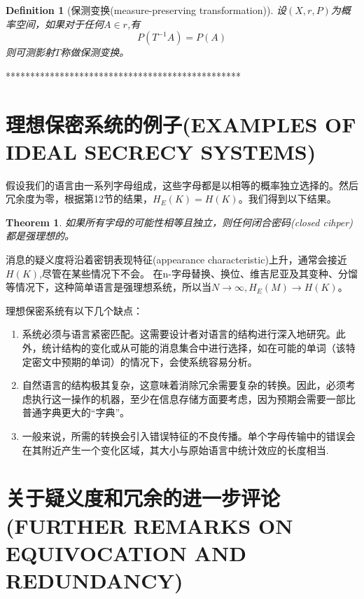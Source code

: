 \documentclass[]{article}
\newtheorem{theorem}{Theorem}
\newtheorem {definition}{Definition}
\begin{document}
\begin{definition}[保测变换(measure-preserving transformation)]
	设$(X,r,P)$为概率空间，如果对于任何$A\in r$,有
	\[P(T^{-1}A)=P(A)\]
	则可测影射$T$称做保测变换。
\end{definition}
************************************************\par
\vspace{1cm}
\newpage
%   
%

\section{理想保密系统的例子(EXAMPLES OF IDEAL SECRECY SYSTEMS)}

假设我们的语言由一系列字母组成，这些字母都是以相等的概率独立选择的。然后冗余度为零，根据第12节的结果，$H_E(K)=H(K)$。我们得到以下结果。

\begin{theorem}
	如果所有字母的可能性相等且独立，则任何闭合密码(closed cihper)都是强理想的。
\end{theorem}

消息的疑义度将沿着密钥表现特征(appearance characteristic)上升，通常会接近$H(K)$,尽管在某些情况下不会。
在n-字母替换、换位、维吉尼亚及其变种、分馏等情况下，这种简单语言是强理想系统，所以当$N\rightarrow \infty,H_E(M)\rightarrow H(K)$。

理想保密系统有以下几个缺点：
\begin{enumerate}
	\item 系统必须与语言紧密匹配。这需要设计者对语言的结构进行深入地研究。此外，统计结构的变化或从可能的消息集合中进行选择，如在可能的单词（该特定密文中预期的单词）的情况下，会使系统容易分析。
	\item 自然语言的结构极其复杂，这意味着消除冗余需要复杂的转换。因此，必须考虑执行这一操作的机器，至少在信息存储方面要考虑，因为预期会需要一部比普通字典更大的“字典”。
	\item 一般来说，所需的转换会引入错误特征的不良传播。单个字母传输中的错误会在其附近产生一个变化区域，其大小与原始语言中统计效应的长度相当.
\end{enumerate}

\newpage
%   
%

\section{关于疑义度和冗余的进一步评论(FURTHER REMARKS ON EQUIVOCATION AND REDUNDANCY)}
\end{document}
